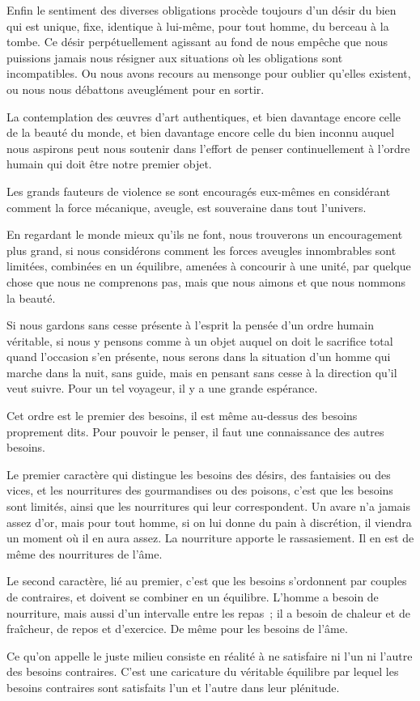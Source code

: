 \documentclass[french,twoside]{book} %
\begin{document}
Enfin le sentiment des diverses obligations procède toujours d'un désir du bien qui est unique, fixe, identique à lui-même, pour tout homme, du berceau à la tombe. Ce désir perpétuellement agissant au fond de nous empêche que nous puissions jamais nous résigner aux situations où les obligations sont incompatibles. Ou nous avons recours au mensonge pour oublier qu'elles existent, ou nous nous débattons aveuglément pour en sortir.\par
La contemplation des œuvres d'art authentiques, et bien davantage encore celle de la beauté du monde, et bien davantage encore celle du bien inconnu auquel nous aspirons peut nous soutenir dans l'effort de penser continuellement à l'ordre humain qui doit être notre premier objet.\par
Les grands fauteurs de violence se sont encouragés eux-mêmes en considérant comment la force mécanique, aveugle, est souveraine dans tout l'univers.\par
En regardant le monde mieux qu'ils ne font, nous trouverons un encouragement plus grand, si nous considérons comment les forces aveugles innombrables sont limitées, combinées en un équilibre, amenées à concourir à une unité, par quelque chose que nous ne comprenons pas, mais que nous aimons et que nous nommons la beauté.\par
Si nous gardons sans cesse présente à l'esprit la pensée d'un ordre humain véritable, si nous y pensons comme à un objet auquel on doit le sacrifice total quand l'occasion s'en présente, nous serons dans la situation d'un homme qui marche dans la nuit, sans guide, mais en pensant sans cesse à la direction qu'il veut suivre. Pour un tel voyageur, il y a une grande espérance.\par
Cet ordre est le premier des besoins, il est même au-dessus des besoins proprement dits. Pour pouvoir le penser, il faut une connaissance des autres besoins.\par
Le premier caractère qui distingue les besoins des désirs, des fantaisies ou des vices, et les nourritures des gourmandises ou des poisons, c'est que les besoins sont limités, ainsi que les nourritures qui leur correspondent. Un avare n'a jamais assez d'or, mais pour tout homme, si on lui donne du pain à discrétion, il viendra un moment où il en aura assez. La nourriture apporte le rassasiement. Il en est de même des nourritures de l'âme.\par
Le second caractère, lié au premier, c'est que les besoins s'ordonnent par couples de contraires, et doivent se combiner en un équilibre. L'homme a besoin de nourriture, mais aussi d'un intervalle entre les repas ; il a besoin de chaleur et de fraîcheur, de repos et d'exercice. De même pour les besoins de l'âme.\par
Ce qu'on appelle le juste milieu consiste en réalité à ne satisfaire ni l'un ni l'autre des besoins contraires. C'est une caricature du véritable équilibre par lequel les besoins contraires sont satisfaits l'un et l'autre dans leur plénitude.
\end{document}
